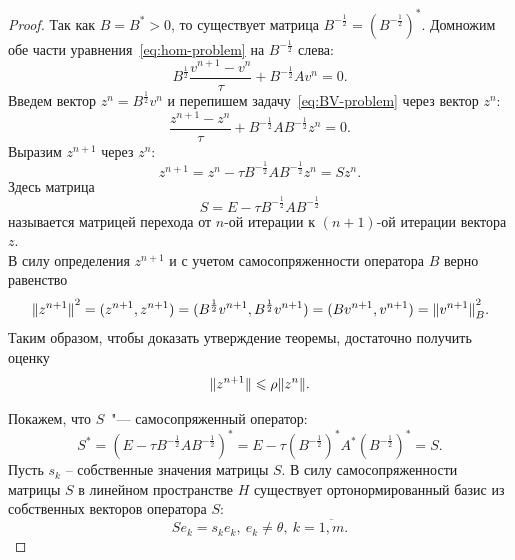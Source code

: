 \documentclass[11pt,a4paper,twoside]{report}
\numberwithin{equation}{section}
\theoremstyle{definition}
\theoremstyle{plain}
\DeclarePairedDelimiter\norm{\lVert}{\rVert}
\begin{document}
\begin{proof}
    Так как $B = B^\ast > 0$, то существует матрица $B^{-\frac{1}{2}} =
    \left(B^{-\frac{1}{2}}\right)^*$. Домножим обе части уравнения~\eqref{eq:hom-problem}
    на $B^{-\frac{1}{2}}$ слева:
    \begin{equation}
        \label{eq:BV-problem}
        B^{\frac{1}{2}}\frac{v^{n+1} - v^n}{\tau} + B^{-\frac{1}{2}}Av^n = 0.
    \end{equation}
    Введем вектор $z^n = B^{\frac{1}{2}}v^n$ и перепишем задачу~\eqref{eq:BV-problem}
    через вектор $z^n$:
    $$
        \frac{z^{n+1} - z^n}{\tau} + B^{-\frac{1}{2}}AB^{-\frac{1}{2}}z^n = 0.
    $$
    Выразим $z^{n+1}$ через $z^n$:
    $$
        z^{n+1} = z^n - \tau B^{-\frac{1}{2}}AB^{-\frac{1}{2}}z^n = Sz^n.
    $$
    Здесь матрица
    \begin{equation}
        \label{eq:S-eq}
        S = E - \tau B^{-\frac{1}{2}}AB^{-\frac{1}{2}}
    \end{equation}
    называется матрицей перехода от $n$-ой итерации к $(n+1)$-ой итерации вектора $z$.
    \\
    В силу определения $z^{n+1}$ и с учетом самосопряженности оператора $B$ верно равенство
    $$
        {\norm{z^{n+1}}}^2 = (z^{n+1}, z^{n+1}) =
        (B^{\frac{1}{2}}v^{n+1}, B^{\frac{1}{2}}v^{n+1}) = (Bv^{n+1}, v^{n+1}) =
        {\norm{v^{n+1}}}_B^2.
    $$
    Таким образом, чтобы доказать утверждение теоремы, достаточно получить оценку
    $$
        {\norm{z^{n+1}}} \leqslant \rho {\norm{z^n}}.
    $$

    Покажем, что $S$~"--- самосопряженный оператор:
    $$
        S^* = \left(E - \tau B^{-\frac{1}{2}}AB^{-\frac{1}{2}}\right)^* =
        E - \tau \left(B^{-\frac{1}{2}}\right)^* A^* \left(B^{-\frac{1}{2}}\right)^* = S.
    $$
    Пусть $s_k$ -- собственные значения матрицы $S$.
    В силу самосопряженности матрицы $S$ в линейном пространстве $H$
    существует ортонормированный базис из собственных векторов оператора $S$:
    \begin{equation}
        \label{eq:S-basis}
        Se_k = s_ke_k, ~e_k \neq \theta, ~k = \overline{1,m}.
    \end{equation}


\end{proof}
\end{document}
